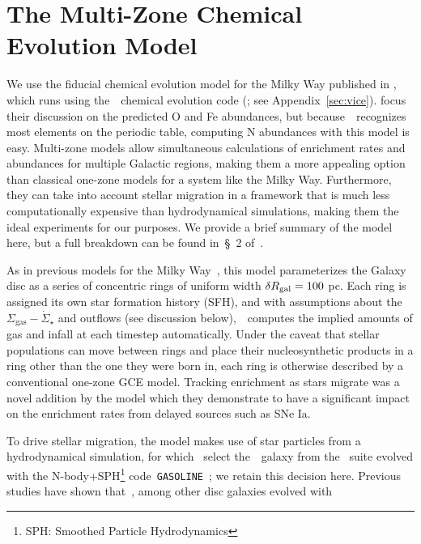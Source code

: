 \documentclass[ms.tex]{subfiles}
\begin{document}
\section{The Multi-Zone Chemical Evolution Model}
\label{sec:multizone}

We use the fiducial chemical evolution model for the Milky Way published in
\citet{Johnson2021}, which runs using the~\vice~chemical evolution code
(\citealp{Johnson2020, Griffith2021a}; see Appendix~\ref{sec:vice}).
\citet{Johnson2021} focus their discussion on the predicted O and Fe
abundances, but because~\vice~recognizes most elements on the periodic table,
computing N abundances with this model is easy.
Multi-zone models allow simultaneous calculations of enrichment rates and
abundances for multiple Galactic regions, making them a more appealing option
than classical one-zone models for a system like the Milky Way.
Furthermore, they can take into account stellar migration in a framework that
is much less computationally expensive than hydrodynamical simulations, making
them the ideal experiments for our purposes.
We provide a brief summary of the model here, but a full breakdown can be found
in~\S~2 of~\citet{Johnson2021}.
\par
As in previous models for the Milky Way~\citep[e.g.][]{Matteucci1989,
Schoenrich2009, Minchev2013, Minchev2014, Minchev2017, Sharma2021}, this model
parameterizes the Galaxy disc as a series of concentric rings of uniform width
$\delta R_\text{gal} = 100$ pc.
Each ring is assigned its own star formation history (SFH), and with
assumptions about the~$\Sigma_\text{gas}-\dot{\Sigma}_\star$ and outflows (see
discussion below),~\vice~computes the implied amounts of gas and infall at each
timestep automatically.
Under the caveat that stellar populations can move between rings and place
their nucleosynthetic products in a ring other than the one they were born in,
each ring is otherwise described by a conventional one-zone GCE model.
Tracking enrichment as stars migrate was a novel addition by the
\citet{Johnson2021} model which they demonstrate to have a significant impact
on the enrichment rates from delayed sources such as SNe Ia.
\par
To drive stellar migration, the model makes use of star particles from a
hydrodynamical simulation, for which~\citet{Johnson2021} select the~\hsim~galaxy
from the~\citet{Christensen2012} suite evolved with the N-body+SPH\footnote{
	SPH: Smoothed Particle Hydrodynamics
} code~\texttt{GASOLINE}~\citep{Wadsley2004}; we retain this decision here.
Previous studies have shown that~\hsim, among other disc galaxies evolved with
\end{document}
